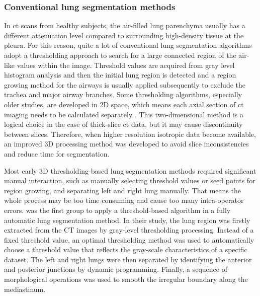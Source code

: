 \subsubsection{Conventional lung segmentation methods}
In \gls{ct} scans from healthy subjects, the air-filled lung parenchyma usually has a different attenuation level compared to surrounding high-density tissue at the pleura. For this reason, quite a lot of conventional lung segmentation algorithms adopt a thresholding approach to search for a large connected region of the air-like values within the image. Threshold values are acquired from gray level histogram analysis and then the initial lung region is detected and a region growing method for the airways is usually applied subsequently to exclude the trachea and major airway branches. Some thresholding algorithms, especially older studies, are developed in 2D space, which means each axial section of \gls{ct} imaging needs to be calculated separately \citep{kalender1991semiautomatic,kemerink1998segmentation,leader2003automated,armato2004automated}. This two-dimensional method is a logical choice in the case of thick-slice \gls{ct} data, but it may cause discontinuity between slices. Therefore, when higher resolution isotropic data become available, an improved 3D processing method \citep{hu2001automatic,ukil2005smoothing,sun20063d} was developed to avoid slice inconsistencies and reduce time for segmentation.

Most early 3D thresholding-based lung segmentation methods \citep{keller1981automatic,hedlund1982two,hoffman1983noninvasive,hoffman1985effecta,hoffman1985effectb} required significant manual interaction, such as manually selecting threshold values or seed points for region growing, and separating left and right lung manually. That means the whole process may be too time consuming and cause too many intra-operator errors. \cite{hu2001automatic} was the first group to apply a threshold-based algorithm in a fully automatic lung segmentation method. In their study, the lung region was firstly extracted from the CT images by gray-level thresholding processing. Instead of a fixed threshold value, an optimal thresholding method was used to automatically choose a threshold value that reflects the gray-scale characteristics of a specific dataset. The left and right lungs were then separated by identifying the anterior and posterior junctions by dynamic programming. Finally, a sequence of morphological operations was used to smooth the irregular boundary along the mediastinum.

